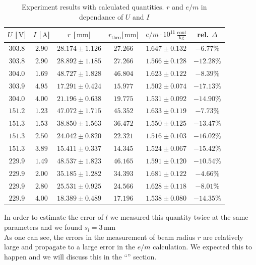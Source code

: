\documentclass{scrreprt}
\newcommand{\unit}[1]{\ensuremath{\, \mathrm{#1}}}
\begin{document}
\begin{table}[H]
\center
\begin{tabular}{|c|c|c|c|c|c|}
\hline
$U$ [$\unit{V}$] & $I$ [$\unit{A}$] & $r$ [$\unit{mm}$] & $r_{\text{theo}}$[$\unit{mm}$] & $e/m \cdot 10^{11} \unit{\frac{coul}{kg}}$ & rel. $\Delta$\\ \hline\hline
$303.8$ & $2.90$ & $28.174 \pm 1.126$ & $27.266$ & $1.647 \pm 0.132$ & $-6.77 \%$\\
$303.8$ & $2.90$ & $28.892 \pm 1.185$ & $27.266$ & $1.566 \pm 0.128$ & $-12.28 \%$\\
$304.0$ & $1.69$ & $48.727 \pm 1.828$ & $46.804$ & $1.623 \pm 0.122$ & $-8.39 \%$\\
$303.9$ & $4.95$ & $17.291 \pm 0.424$ & $15.977$ & $1.502 \pm 0.074$ & $-17.13 \%$\\
$304.0$ & $4.00$ & $21.196 \pm 0.638$ & $19.775$ & $1.531 \pm 0.092$ & $-14.90 \%$\\
$151.2$ & $1.23$ & $47.072 \pm 1.715$ & $45.352$ & $1.633 \pm 0.119$ & $-7.73 \%$\\
$151.3$ & $1.53$ & $38.850 \pm 1.563$ & $36.472$ & $1.550 \pm 0.125$ & $-13.47 \%$\\
$151.3$ & $2.50$ & $24.042 \pm 0.820$ & $22.321$ & $1.516 \pm 0.103$ & $-16.02 \%$\\
$151.3$ & $3.89$ & $15.411 \pm 0.337$ & $14.345$ & $1.524 \pm 0.067$ & $-15.42 \%$\\
$229.9$ & $1.49$ & $48.537 \pm 1.823$ & $46.165$ & $1.591 \pm 0.120$ & $-10.54 \%$\\
$229.9$ & $2.00$ & $35.185 \pm 1.282$ & $34.393$ & $1.681 \pm 0.122$ & $-4.66 \%$\\
$229.9$ & $2.80$ & $25.531 \pm 0.925$ & $24.566$ & $1.628 \pm 0.118$ & $-8.01 \%$\\
$229.9$ & $4.00$ & $18.389 \pm 0.489$ & $17.196$ & $1.538 \pm 0.080$ & $-14.35 \%$\\
\hline
\end{tabular}
\caption{Experiment results with calculated quantities. $r$ and $e/m$ in dependance of $U$ and $I$}
\end{table}

In order to estimate the error of $l$ we measured this quantity twice at the same parameters and we found $s_l = 3 \unit{mm}$\\

As one can see, the errors in the measurement of beam radius $r$ are relatively large and propagate to a large error in the $e/m$ calculation. We expected this to happen and we will discuss this in the ``'' section.
\end{document}
